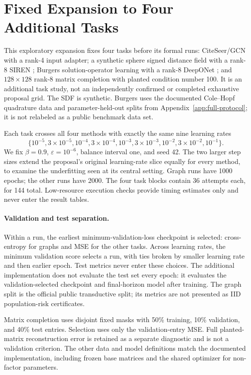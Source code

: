 \section{Fixed Expansion to Four Additional Tasks}
\label{app:new-task-expansion}
This exploratory expansion fixes four tasks before its formal runs:
CiteSeer/GCN \citep{kipf2017gcn} with a rank-4 input adapter; a synthetic sphere signed
distance field with a rank-8 SIREN \citep{sitzmann2020siren}; Burgers solution-operator learning
with a rank-8 DeepONet \citep{lu2019deeponet}; and $128\times128$ rank-8 matrix completion
with planted condition number 100. It is an additional task study,
not an independently confirmed or completed exhaustive proposal grid.
The SDF is synthetic. Burgers uses the documented Cole--Hopf
quadrature data and parameter-held-out splits from
Appendix~\ref{app:full-protocol}; it is not relabeled as a public
benchmark data set.

Each task crosses all four methods with exactly the same nine learning
rates
\[
\{10^{-5},3\!\times\!10^{-5},10^{-4},3\!\times\!10^{-4},
10^{-3},3\!\times\!10^{-3},10^{-2},3\!\times\!10^{-2},10^{-1}\}.
\]
We fix $\beta=0.9$, $\varepsilon=10^{-6}$, balance interval one,
and seed 42. The two larger step sizes extend the proposal's original
learning-rate slice equally for every method, to examine the
underfitting seen at its central setting. Graph runs have 1000 epochs;
the other runs have 2000. The four task blocks contain 36 attempts
each, for 144 total. Low-resource execution checks provide timing
estimates only and never enter the result tables.

\paragraph{Validation and test separation.}
Within a run, the earliest minimum-validation-loss checkpoint is
selected: cross-entropy for graphs and MSE for the other tasks.
Across learning rates, the minimum validation score selects a run,
with ties broken by smaller learning rate and then earlier epoch.
Test metrics never enter these choices. The additional implementation
does not evaluate the test set every epoch: it evaluates the
validation-selected checkpoint and final-horizon model after training.
The graph split is the official public transductive split; its metrics
are not presented as IID population-risk certificates.

Matrix completion uses disjoint fixed masks with 50\% training,
10\% validation, and 40\% test entries. Selection uses only the
validation-entry MSE. Full planted-matrix reconstruction error is
retained as a separate diagnostic and is not a validation criterion.
The other data and model definitions match the documented
implementation, including frozen base matrices and the shared
optimizer for non-factor parameters.

